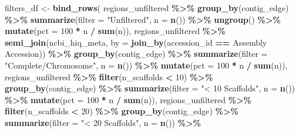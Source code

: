 \documentclass[
]{article}
\newenvironment{Shaded}{\begin{snugshade}}{\end{snugshade}}
\newcommand{\AttributeTok}[1]{\textcolor[rgb]{0.13,0.29,0.53}{#1}}
\newcommand{\DecValTok}[1]{\textcolor[rgb]{0.00,0.00,0.81}{#1}}
\newcommand{\FunctionTok}[1]{\textcolor[rgb]{0.13,0.29,0.53}{\textbf{#1}}}
\newcommand{\NormalTok}[1]{#1}
\newcommand{\OtherTok}[1]{\textcolor[rgb]{0.56,0.35,0.01}{#1}}
\newcommand{\SpecialCharTok}[1]{\textcolor[rgb]{0.81,0.36,0.00}{\textbf{#1}}}
\newcommand{\StringTok}[1]{\textcolor[rgb]{0.31,0.60,0.02}{#1}}
\begin{document}
\begin{Shaded}
\begin{Highlighting}[]
\NormalTok{filters\_df }\OtherTok{\textless{}{-}} \FunctionTok{bind\_rows}\NormalTok{(}
\NormalTok{  regions\_unfiltered }\SpecialCharTok{\%\textgreater{}\%}
    \FunctionTok{group\_by}\NormalTok{(contig\_edge) }\SpecialCharTok{\%\textgreater{}\%}
    \FunctionTok{summarize}\NormalTok{(}\AttributeTok{filter =} \StringTok{"Unfiltered"}\NormalTok{, }\AttributeTok{n =} \FunctionTok{n}\NormalTok{()) }\SpecialCharTok{\%\textgreater{}\%}
    \FunctionTok{ungroup}\NormalTok{() }\SpecialCharTok{\%\textgreater{}\%}
    \FunctionTok{mutate}\NormalTok{(}\AttributeTok{pct =} \DecValTok{100} \SpecialCharTok{*}\NormalTok{ n }\SpecialCharTok{/} \FunctionTok{sum}\NormalTok{(n)),}
\NormalTok{  regions\_unfiltered }\SpecialCharTok{\%\textgreater{}\%}
    \FunctionTok{semi\_join}\NormalTok{(ncbi\_hiq\_meta, }\AttributeTok{by =} \FunctionTok{join\_by}\NormalTok{(accession\_id }\SpecialCharTok{==} \StringTok{\textasciigrave{}}\AttributeTok{Assembly Accession}\StringTok{\textasciigrave{}}\NormalTok{)) }\SpecialCharTok{\%\textgreater{}\%}
    \FunctionTok{group\_by}\NormalTok{(contig\_edge) }\SpecialCharTok{\%\textgreater{}\%}
    \FunctionTok{summarize}\NormalTok{(}\AttributeTok{filter =} \StringTok{"Complete/Chromosome"}\NormalTok{, }\AttributeTok{n =} \FunctionTok{n}\NormalTok{()) }\SpecialCharTok{\%\textgreater{}\%}
    \FunctionTok{mutate}\NormalTok{(}\AttributeTok{pct =} \DecValTok{100} \SpecialCharTok{*}\NormalTok{ n }\SpecialCharTok{/} \FunctionTok{sum}\NormalTok{(n)),}
\NormalTok{  regions\_unfiltered }\SpecialCharTok{\%\textgreater{}\%}
    \FunctionTok{filter}\NormalTok{(n\_scaffolds }\SpecialCharTok{\textless{}} \DecValTok{10}\NormalTok{) }\SpecialCharTok{\%\textgreater{}\%}
    \FunctionTok{group\_by}\NormalTok{(contig\_edge) }\SpecialCharTok{\%\textgreater{}\%}
    \FunctionTok{summarize}\NormalTok{(}\AttributeTok{filter =} \StringTok{"\textless{} 10 Scaffolds"}\NormalTok{, }\AttributeTok{n =} \FunctionTok{n}\NormalTok{()) }\SpecialCharTok{\%\textgreater{}\%}
    \FunctionTok{mutate}\NormalTok{(}\AttributeTok{pct =} \DecValTok{100} \SpecialCharTok{*}\NormalTok{ n }\SpecialCharTok{/} \FunctionTok{sum}\NormalTok{(n)),}
\NormalTok{  regions\_unfiltered }\SpecialCharTok{\%\textgreater{}\%}
    \FunctionTok{filter}\NormalTok{(n\_scaffolds }\SpecialCharTok{\textless{}} \DecValTok{20}\NormalTok{) }\SpecialCharTok{\%\textgreater{}\%}
    \FunctionTok{group\_by}\NormalTok{(contig\_edge) }\SpecialCharTok{\%\textgreater{}\%}
    \FunctionTok{summarize}\NormalTok{(}\AttributeTok{filter =} \StringTok{"\textless{} 20 Scaffolds"}\NormalTok{, }\AttributeTok{n =} \FunctionTok{n}\NormalTok{()) }\SpecialCharTok{\%\textgreater{}\%}

\end{Highlighting}
\end{Shaded}
\end{document}
